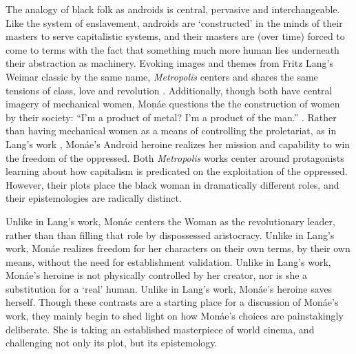 \documentclass[a4paper, 11pt]{article} %
\begin{document}
The analogy of black folk as androids is central, pervasive and interchangeable. 
Like the system of enslavement, androids are `constructed' in the minds of their masters to serve capitalistic systems, and their masters are (over time) forced to come to terms with the fact that something much more human lies underneath their abstraction as machinery.
Evoking images and themes from Fritz Lang's Weimar classic by the same name, \emph{Metropolis} centers and shares the same tensions of class, love and revolution .
Additionally, though both have central imagery of mechanical women, Mon\'ae questions the the construction of women by their society: ``I'm a product of metal? I'm a product of the man.'' . 
Rather than having mechanical women as a means of controlling the proletariat, as in Lang's work , Mon\'ae's Android heroine realizes her mission and capability to win the freedom of the oppressed.
Both \emph{Metropolis} works center around protagonists learning about how capitalism is predicated on the exploitation of the oppressed.
However, their plots place the black woman in dramatically different roles, and their epistemologies are radically distinct.

Unlike in Lang's work, Mon\'ae centers the Woman as the revolutionary leader, rather than than filling that role by dispossessed aristocracy.
Unlike in Lang's work, Mon\'ae realizes freedom for her characters on their own terms, by their own means, without the need for establishment validation.
Unlike in Lang's work, Mon\'ae's heroine is not physically controlled by her creator, nor is she a substitution for a `real' human.
Unlike in Lang's work, Mon\'ae's heroine saves herself.
Though these contrasts are a starting place for a discussion of Mon\'ae's work, they mainly begin to shed light on how Mon\'ae's choices are painstakingly deliberate.
She is taking an established masterpiece of world cinema, and challenging not only its plot, but its epistemology.
\end{document}
